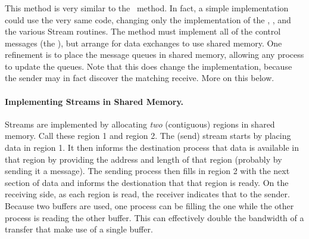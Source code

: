 \ifcodefirst
\else
{}
\fi

%

\subsubsection{\shmemname}

This method is very similar to the \tcpname\ method.  In fact, a simple
implementation could use the very same code, changing only the implementation
of the , , and the various
Stream routines.  The method must implement all of the control messages (the
), but arrange for data exchanges to use shared
memory.  One refinement is to place the message queues in shared memory,
allowing any process to update the queues.  Note that this does change the
 implementation, because the sender may in fact discover
the matching receive.  More on this below.

\paragraph{Implementing Streams in Shared Memory.}
Streams are implemented by allocating \emph{two} (contiguous) regions in
shared memory.  Call these region 1 and region 2.  The (send) stream starts by
placing data in region 1.  It then informs the destination process that data
is available in that region by providing the address and length of that
region (probably by sending it a message).  The sending process then fills in
region 2 with the next section of data and informs the destionation that that
region is ready.  On the receiving side, as each region is read, the receiver
indicates that to the sender.  Because two buffers are used, one process can
be filling the one while the other process is reading the other buffer.  This
can effectively double the bandwidth of a transfer that make use of a single
buffer.


